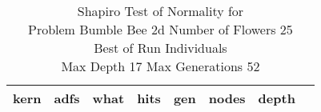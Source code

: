 \begin{table}[H]
\caption{Shapiro Test of Normality for \\ Problem  Bumble Bee 2d  Number of Flowers 25\\Best of Run Individuals \\ Max Depth 17 Max Generations 52\\}
\begin{center}
\scalebox{0.8} %
{
\begin{tabular}{lrrrrrrr}
\hline
kern & adfs & what & hits & gen & nodes & depth \\
\hline


\end{tabular}
}
\end{center}
\end{table}

